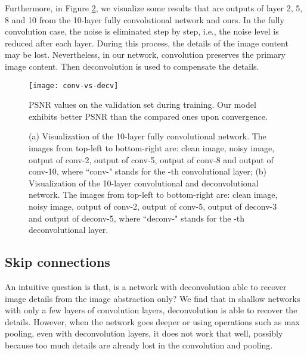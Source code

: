 \documentclass[10pt,journal,compsoc]{IEEEtran}
\begin{document}
Furthermore, in Figure \ref{fig3}, we visualize some results that are outputs of layer 2, 5, 8 and 10
from the 10-layer fully convolutional network and ours. In the fully convolution case, the noise
is eliminated step by step, i.e., the noise level is reduced after each layer. During this process,
the details of the image content may be lost. Nevertheless, in our network, convolution  preserves
the primary image content. Then deconvolution is used to compensate the details.


\begin{figure}[htb!]
\centering
\texttt{[image: conv-vs-decv]}
\caption{ PSNR  values  on the validation set during training. Our model  exhibits better PSNR
than the compared ones upon convergence.}
\label{fig2}
\end{figure}



\begin{figure}[htb!]
\centering
{}
\caption{ (a) Visualization of the 10-layer fully convolutional network. The images from
top-left to bottom-right are: clean image, noisy image, output of conv-2, output of conv-5,
output of conv-8 and output of conv-10, where ``conv-" stands for the -th convolutional layer;
(b) Visualization of the 10-layer convolutional and deconvolutional network. The images from
top-left to bottom-right are: clean image, noisy image, output of conv-2, output of conv-5,
output of deconv-3 and output of deconv-5, where ``deconv-" stands for the -th deconvolutional layer.}
\label{fig3}
\end{figure}




\subsection{Skip connections}

An intuitive question is that, is a network with deconvolution able to recover image details from
the image abstraction only? We find that in shallow networks with only a few layers
of convolution layers, deconvolution is able to recover the details. However, when the
network goes deeper or using operations such as max pooling, even with deconvolution layers, it does not work
that well, possibly because too much details are already lost in the convolution and pooling.
\end{document}
